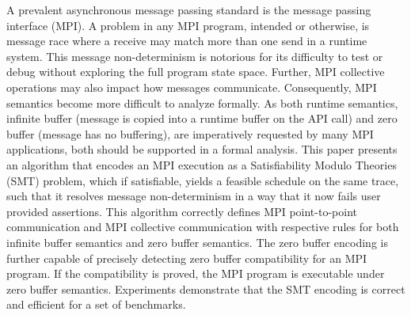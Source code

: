 %
A prevalent asynchronous message passing standard is the message passing interface (MPI).
%
A problem in any MPI program, intended or otherwise, is message race where a receive may match more than one send in a runtime system.
%
This message non-determinism is notorious for its difficulty to test or debug without exploring the full program state space. 
%
Further, MPI collective operations may also impact how messages communicate.
%
Consequently, MPI semantics become more difficult to analyze formally. 
%
As both runtime semantics, infinite buffer (message is copied into a runtime buffer on the API call) and zero buffer (message has no buffering), are imperatively requested by many MPI applications, both should be supported in a formal analysis. 
%
This paper presents an algorithm that encodes an MPI execution as a Satisfiability Modulo Theories (SMT) problem, which if satisfiable, yields a feasible schedule on the same trace, such that it resolves message non-determinism in a way that it now fails user provided assertions.
%
This algorithm correctly defines MPI point-to-point communication and MPI collective communication with respective rules for both infinite buffer semantics and zero buffer semantics. 
%
The zero buffer encoding is further capable of precisely detecting zero buffer compatibility for an MPI program. 
%
If the compatibility is proved, the MPI program is executable under zero buffer semantics.
%
Experiments demonstrate that the SMT encoding is correct and efficient for a set of benchmarks. 
%
